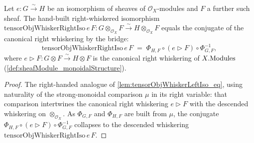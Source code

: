 \begin{lemma}

  \label{lem:tensorObjWhiskerRightIso_eq}
  Let \(e : G \xrightarrow{\sim} H\) be an isomorphism of sheaves of
  \(\mathcal{O}_X\)-modules and \(F\) a further such sheaf. The hand-built
  right-whiskered isomorphism \(\mathrm{tensorObjWhiskerRightIso}\,e\,F :
  G \otimes_{\mathcal{O}_X} F \xrightarrow{\sim} H \otimes_{\mathcal{O}_X} F\)
  equals the conjugate of the canonical right whiskering by the bridge:
  \[
    \mathrm{tensorObjWhiskerRightIso}\,e\,F
      \;=\; \Phi_{H,F} \circ (e \rhd F) \circ \Phi_{G,F}^{-1},
  \]
  where \(e \rhd F : G \otimes F \xrightarrow{\sim} H \otimes F\) is the canonical
  right whiskering of \(X.\mathrm{Modules}\) (\cref{def:sheafModule_monoidalStructure}).
\end{lemma}

\begin{proof}
  \leanok
  The right-handed analogue of \cref{lem:tensorObjWhiskerLeftIso_eq}, using
  naturality of the strong-monoidal comparison \(\mu\) in its right variable: that
  comparison intertwines the canonical right whiskering \(e \rhd F\) with the
  descended whiskering on \(\otimes_{\mathcal{O}_X}\). As \(\Phi_{G,F}\) and
  \(\Phi_{H,F}\) are built from \(\mu\), the conjugate
  \(\Phi_{H,F} \circ (e \rhd F) \circ \Phi_{G,F}^{-1}\) collapses to the descended
  whiskering \(\mathrm{tensorObjWhiskerRightIso}\,e\,F\).
\end{proof}


